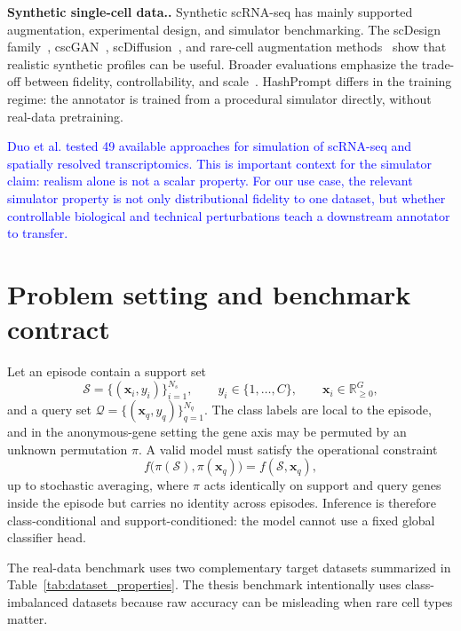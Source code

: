 \documentclass{article}
\newcommand{\myparagraph}[1]{\noindent\textbf{#1.} }
\newcommand{\phflo}[1]{\textcolor{blue}{#1}}
\newcommand{\R}{\mathbb{R}}
\begin{document}
\myparagraph{Synthetic single-cell data.}
Synthetic scRNA-seq has mainly supported augmentation, experimental design, and simulator benchmarking. The scDesign family~\cite{scdesign,scdesign2,scdesign3}, cscGAN~\cite{marouf2020realistic}, scDiffusion~\cite{luo2024scdiffusion}, and rare-cell augmentation methods~\cite{bej2021automated,nouri2025single} show that realistic synthetic profiles can be useful. Broader evaluations emphasize the trade-off between fidelity, controllability, and scale~\cite{crowell2023shaky,duo2024systematic}. HashPrompt differs in the training regime: the annotator is trained from a procedural simulator directly, without real-data pretraining.

\phflo{Duo et al. tested 49 available approaches for simulation of scRNA-seq and spatially resolved transcriptomics. This is important context for the simulator claim: realism alone is not a scalar property. For our use case, the relevant simulator property is not only distributional fidelity to one dataset, but whether controllable biological and technical perturbations teach a downstream annotator to transfer.}

\section{Problem setting and benchmark contract}

Let an episode contain a support set
\begin{equation}
    \mathcal{S}=\{(\mathbf{x}_i,y_i)\}_{i=1}^{N_s}, \qquad y_i\in\{1,\ldots,C\}, \qquad \mathbf{x}_i\in\R_{\ge 0}^{G},
\end{equation}
and a query set \(\mathcal{Q}=\{(\mathbf{x}_q,y_q)\}_{q=1}^{N_q}\). The class labels are local to the episode, and in the anonymous-gene setting the gene axis may be permuted by an unknown permutation \(\pi\). A valid model must satisfy the operational constraint
\begin{equation}
    f\bigl(\pi(\mathcal{S}),\pi(\mathbf{x}_q)\bigr)=f(\mathcal{S},\mathbf{x}_q),
\end{equation}
up to stochastic averaging, where \(\pi\) acts identically on support and query genes inside the episode but carries no identity across episodes. Inference is therefore class-conditional and support-conditioned: the model cannot use a fixed global classifier head.

The real-data benchmark uses two complementary target datasets summarized in Table~\ref{tab:dataset_properties}. The thesis benchmark intentionally uses class-imbalanced datasets because raw accuracy can be misleading when rare cell types matter.
\end{document}
